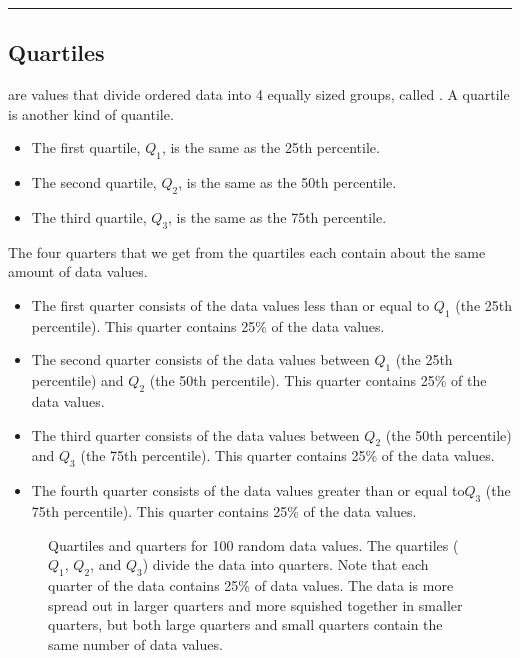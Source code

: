 \documentclass[letterpaper,10pt,english]{jupyterBook}
\begin{document}
\bigskip\hrule\bigskip



\subsection{Quartiles}
\label{\detokenize{Ch2 Descriptive Statistics/2.1 Measures of Position:quartiles}}
\sphinxAtStartPar
{} are values that divide ordered data into 4 equally sized groups, called . A quartile is another kind of quantile.
\begin{itemize}
\item {} 
\sphinxAtStartPar
The first quartile, \(Q_1\), is the same as the 25th percentile.

\item {} 
\sphinxAtStartPar
The second quartile, \(Q_2\), is the same as the 50th percentile.

\item {} 
\sphinxAtStartPar
The third quartile, \(Q_3\), is the same as the 75th percentile.

\end{itemize}

\sphinxAtStartPar
The four quarters that we get from the quartiles each contain about the same amount of data values.
\begin{itemize}
\item {} 
\sphinxAtStartPar
The first quarter consists of the data values less than or equal to \(Q_1\) (the 25th percentile). This quarter contains 25\% of the data values.

\item {} 
\sphinxAtStartPar
The second quarter consists of the data values between \(Q_1\) (the 25th percentile) and \(Q_2\) (the 50th percentile). This quarter contains 25\% of the data values.

\item {} 
\sphinxAtStartPar
The third quarter consists of the data values between \(Q_2\) (the 50th percentile) and \(Q_3\) (the 75th percentile). This quarter contains 25\% of the data values.

\item {} 
\sphinxAtStartPar
The fourth quarter consists of the data values greater than or equal to\(Q_3\) (the 75th percentile). This quarter contains 25\% of the data values.

\end{itemize}

\begin{figure}[htbp]
\centering
\capstart

\noindent{}
\caption{Quartiles and quarters for 100 random data values. The quartiles (\(Q_1\), \(Q_2\), and \(Q_3\)) divide the data into quarters. Note that each quarter of the data contains 25\% of data values. The data is more spread out in larger quarters and more squished together in smaller quarters, but both large quarters and small quarters contain the same number of data values.}\label{\detokenize{Ch2 Descriptive Statistics/2.1 Measures of Position:quartiles-and-quarters}}\end{figure}
\end{document}
